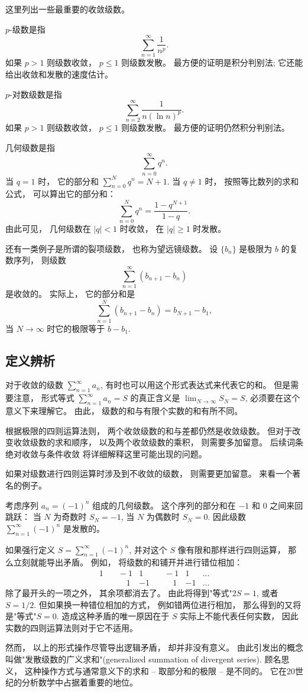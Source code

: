 这里列出一些最重要的收敛级数。

$p$-级数是指
$$
\sum_{n=1}^\infty\frac{1}{n^p}.
$$
如果 $p>1$ 则级数收敛， $p\leq1$ 则级数发散。 最方便的证明是积分判别法; 它还能给出收敛和发散的速度估计。

$p$-对数级数是指
$$
\sum_{n=2}^\infty\frac{1}{n(\ln n)^p}.
$$
如果 $p>1$ 则级数收敛， $p\leq1$ 则级数发散。 最方便的证明仍然积分判别法。

几何级数是指
$$
\sum_{n=0}^\infty q^n.
$$
当 $q=1$ 时， 它的部分和 $\sum_{n=0}^N q^n=N+1$. 当 $q\neq1$ 时， 按照等比数列的求和公式， 可以算出它的部分和：
$$
\sum_{n=0}^N q^n=\frac{1-q^{N+1}}{1-q}.
$$
由此可见， 几何级数在 $|q|<1$ 时收敛， 在 $|q|\geq1$ 时发散。

还有一类例子是所谓的裂项级数， 也称为望远镜级数。 设 $\{b_n\}$ 是极限为 $b$ 的复数序列， 则级数
$$
\sum_{n=1}^\infty(b_{n+1}-b_n)
$$
是收敛的。 实际上， 它的部分和是
$$
\sum_{n=1}^N(b_{n+1}-b_n)=b_{N+1}-b_1,
$$
当 $N\to\infty$ 时它的极限等于 $b-b_1$.

\subsection{定义辨析}
对于收敛的级数 $\sum_{n=1}^\infty a_n$, 有时也可以用这个形式表达式来代表它的和。 但是需要注意， 形式等式 $\sum_{n=1}^\infty a_n=S$ 的真正含义是 $\lim_{N\to\infty}S_N=S$, 必须要在这个意义下来理解它。 由此， 级数的和与有限个实数的和有所不同。 

根据极限的四则运算法则， 两个收敛级数的和与差都仍然是收敛级数。 但对于改变收敛级数的求和顺序， 以及两个收敛级数的乘积， 则需要多加留意。 后续词条绝对收敛与条件收敛 将详细解释这里可能出现的问题。

如果对级数进行四则运算时涉及到不收敛的级数， 则需要更加留意。 来看一个著名的例子。

\begin{example}{}
考虑序列 $a_n=(-1)^n$ 组成的几何级数。 这个序列的部分和在 $-1$ 和 $0$ 之间来回跳跃： 当 $N$ 为奇数时 $S_N=-1$, 当 $N$ 为偶数时 $S_N=0$. 因此级数 $\sum_{n=1}^\infty(-1)^n$ 是发散的。 

如果强行定义 $S=\sum_{n=1}^\infty(-1)^n$, 并对这个 $S$ 像有限和那样进行四则运算， 那么立刻就能导出矛盾。 例如， 将级数的和铺开并进行错位相加：
$$
\begin{aligned}
1 & \quad-1 & 1 & \quad-1 & 1 &...\\
  & \quad\quad1 & -1 & \quad\quad1 & -1 &...
\end{aligned}
$$
除了最开头的一项之外， 其余项都消去了。 由此将得到"等式"$2S=1$, 或者 $S=1/2$. 但如果换一种错位相加的方式， 例如错两位进行相加， 那么得到的又将是"等式"$S=0$. 造成这种矛盾的唯一原因在于 $S$ 实际上不能代表任何实数， 因此实数的四则运算法则对于它不适用。

然而， 以上的形式操作尽管导出逻辑矛盾， 却并非没有意义。 由此引发出的概念叫做"发散级数的广义求和"(generalized summation of divergent series). 顾名思义， 这种操作方式与通常意义下的求和 -- 取部分和的极限 -- 是不同的。 它在20世纪的分析数学中占据着重要的地位。
\end{example}